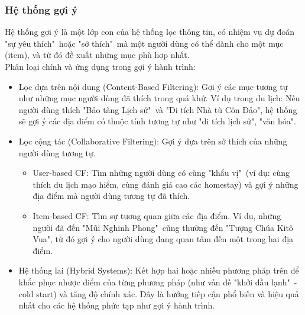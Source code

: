\subsubsection{Hệ thống gợi ý}
Hệ thống gợi ý là một lớp con của hệ thống lọc thông tin, có nhiệm vụ dự đoán "sự yêu thích"\ hoặc "sở thích"\ mà một người dùng có thể dành cho một mục (item), và từ đó đề xuất những mục phù hợp nhất.\\
Phân loại chính và ứng dụng trong gợi ý hành trình:
\begin{itemize}
    \item Lọc dựa trên nội dung (Content-Based Filtering): Gợi ý các mục tương tự như những mục người dùng đã thích trong quá khứ. Ví dụ trong du lịch: Nếu người dùng thích "Bảo tàng Lịch sử"\ và "Di tích Nhà tù Côn Đảo", hệ thống sẽ gợi ý các địa điểm có thuộc tính tương tự như "di tích lịch sử", "văn hóa".
    \item Lọc cộng tác (Collaborative Filtering): Gợi ý dựa trên sở thích của những người dùng tương tự.
        \begin{itemize}
            \item User-based CF: Tìm những người dùng có cùng "khẩu vị"\ (ví dụ: cùng thích du lịch mạo hiểm, cùng đánh giá cao các homestay) và gợi ý những địa điểm mà người dùng tương tự đã thích.
            \item Item-based CF: Tìm sự tương quan giữa các địa điểm. Ví dụ, những người đã đến "Mũi Nghinh Phong"\ cũng thường đến "Tượng Chúa Kitô Vua", từ đó gợi ý cho người dùng đang quan tâm đến một trong hai địa điểm.
        \end{itemize}
    \item Hệ thống lai (Hybrid Systems): Kết hợp hai hoặc nhiều phương pháp trên để khắc phục nhược điểm của từng phương pháp (như vấn đề "khởi đầu lạnh"\ - cold start) và tăng độ chính xác. Đây là hướng tiếp cận phổ biến và hiệu quả nhất cho các hệ thống phức tạp như gợi ý hành trình.
\end{itemize}

